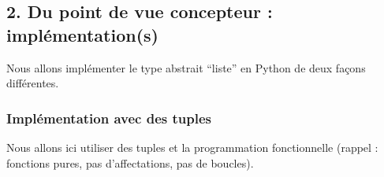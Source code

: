 \documentclass[
  letterpaper,
  DIV=11,
  numbers=noendperiod]{scrartcl}
\begin{document}
\hypertarget{du-point-de-vue-concepteur-impluxe9mentations}{%
\subsection{2. Du point de vue concepteur :
implémentation(s)}\label{du-point-de-vue-concepteur-impluxe9mentations}}

Nous allons implémenter le type abstrait ``liste'' en Python de deux
façons différentes.

\hypertarget{impluxe9mentation-avec-des-tuples}{%
\subsubsection{Implémentation avec des
tuples}\label{impluxe9mentation-avec-des-tuples}}

Nous allons ici utiliser des tuples et la programmation fonctionnelle
(rappel : fonctions pures, pas d'affectations, pas de boucles).
\end{document}
